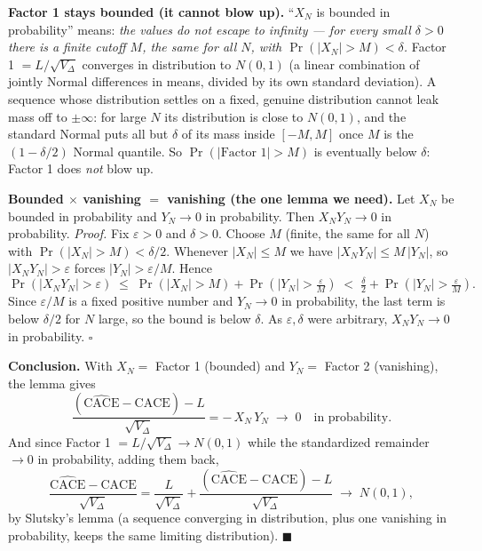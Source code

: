 \documentclass[11pt]{article}
\newcommand{\CACE}{\mathrm{CACE}}
\newcommand{\hCACE}{\widehat{\mathrm{CACE}}}
\begin{document}
\bigskip
\noindent\textbf{Factor 1 stays bounded (it cannot blow up).}
``$X_N$ is bounded in probability'' means: \emph{the values do not escape to
infinity --- for every small $\delta>0$ there is a finite cutoff $M$, the same for
all $N$, with $\Pr(\lvert X_N\rvert > M) < \delta$.} Factor 1 $=L/\sqrt{V_\Delta}$
converges in distribution to $N(0,1)$ (a linear combination of jointly Normal
differences in means, divided by its own standard deviation). A sequence whose
distribution settles on a fixed, genuine distribution cannot leak mass off to
$\pm\infty$: for large $N$ its distribution is close to $N(0,1)$, and the standard
Normal puts all but $\delta$ of its mass inside $[-M, M]$ once $M$ is the
$(1-\delta/2)$ Normal quantile. So $\Pr(\lvert \text{Factor 1}\rvert > M)$ is
eventually below $\delta$: Factor 1 does \emph{not} blow up.

\bigskip
\noindent\textbf{Bounded $\times$ vanishing $=$ vanishing (the one lemma we need).}
Let $X_N$ be bounded in probability and $Y_N \to 0$ in probability. Then
$X_N Y_N \to 0$ in probability. \emph{Proof.} Fix $\varepsilon>0$ and $\delta>0$.
Choose $M$ (finite, the same for all $N$) with $\Pr(\lvert X_N\rvert > M) <
\delta/2$. Whenever $\lvert X_N\rvert \le M$ we have $\lvert X_N Y_N\rvert \le
M\,\lvert Y_N\rvert$, so $\lvert X_N Y_N\rvert > \varepsilon$ forces
$\lvert Y_N\rvert > \varepsilon/M$. Hence
\begin{equation*}
\Pr\!\left(\lvert X_N Y_N\rvert > \varepsilon\right)
\;\le\; \Pr\!\left(\lvert X_N\rvert > M\right)
+ \Pr\!\left(\lvert Y_N\rvert > \tfrac{\varepsilon}{M}\right)
\;<\; \tfrac{\delta}{2} + \Pr\!\left(\lvert Y_N\rvert > \tfrac{\varepsilon}{M}\right).
\end{equation*}
Since $\varepsilon/M$ is a fixed positive number and $Y_N \to 0$ in probability, the
last term is below $\delta/2$ for $N$ large, so the bound is below $\delta$. As
$\varepsilon,\delta$ were arbitrary, $X_N Y_N \to 0$ in probability. \hfill$\square$

\bigskip
\noindent\textbf{Conclusion.}
With $X_N = $ Factor 1 (bounded) and $Y_N = $ Factor 2 (vanishing), the lemma gives
\begin{equation*}
\frac{\left(\hCACE - \CACE\right) - L}{\sqrt{V_\Delta}}
= -\,X_N\,Y_N \;\longrightarrow\; 0 \quad\text{in probability.}
\end{equation*}
And since Factor 1 $=L/\sqrt{V_\Delta} \to N(0,1)$ while the standardized remainder
$\to 0$ in probability, adding them back,
\begin{equation*}
\frac{\hCACE - \CACE}{\sqrt{V_\Delta}}
= \frac{L}{\sqrt{V_\Delta}} + \frac{\left(\hCACE - \CACE\right) - L}{\sqrt{V_\Delta}}
\;\longrightarrow\; N(0,1),
\end{equation*}
by Slutsky's lemma (a sequence converging in distribution, plus one vanishing in
probability, keeps the same limiting distribution). \hfill$\blacksquare$
\end{document}
